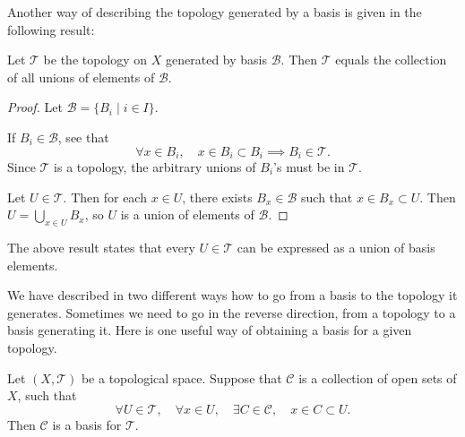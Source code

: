 Another way of describing the topology generated by a basis is given in the following result:

\begin{lemma}\label{lemma:topology-generated-basis-unions}
Let $\mathcal{T}$ be the topology on $X$ generated by basis $\mathcal{B}$. Then $\mathcal{T}$ equals the collection of all unions of elements of $\mathcal{B}$.
\end{lemma}

\begin{proof}
Let $\mathcal{B}=\{B_i\mid i\in I\}$.

\fbox{$\supset$} If $B_i\in\mathcal{B}$, see that
\[\forall x\in B_i,\quad x\in B_i\subset B_i\implies B_i\in\mathcal{T}.\]
Since $\mathcal{T}$ is a topology, the arbitrary unions of $B_i$'s must be in $\mathcal{T}$.

\fbox{$\subset$} Let $U\in\mathcal{T}$. Then for each $x\in U$, there exists $B_x\in\mathcal{B}$ such that $x\in B_x\subset U$. Then $U=\bigcup_{x\in U}B_x$, so $U$ is a union of elements of $\mathcal{B}$.
\end{proof}

\begin{remark}
The above result states that every $U\in\mathcal{T}$ can be expressed as a union of basis elements.
\end{remark}

We have described in two different ways how to go from a basis to the topology it generates. Sometimes we need to go in the reverse direction, from a topology to a basis generating it. Here is one useful way of obtaining a basis for a given topology.

\begin{lemma}\label{lemma:obtain-basis-for-given-topology}
Let $(X,\mathcal{T})$ be a topological space. Suppose that $\mathcal{C}$ is a collection of open sets of $X$, such that
\[\forall U\in\mathcal{T},\quad\forall x\in U,\quad\exists C\in\mathcal{C},\quad x\in C\subset U.\]
Then $\mathcal{C}$ is a basis for $\mathcal{T}$.
\end{lemma}

